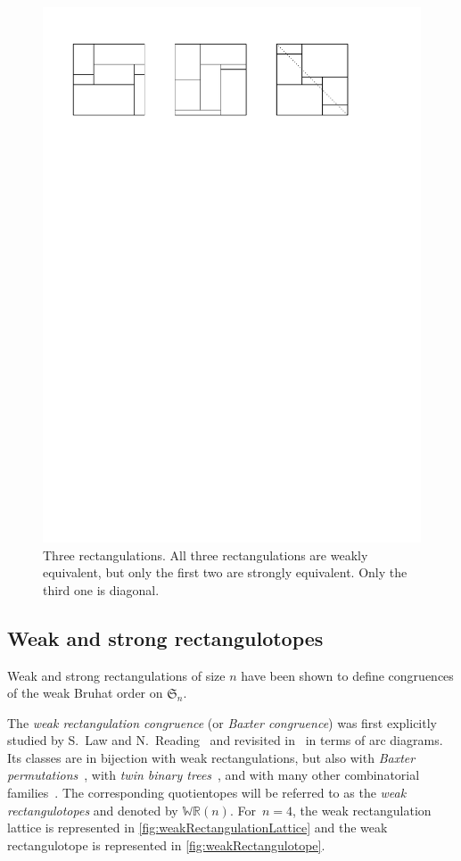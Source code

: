 \documentclass{amsart}
\theoremstyle{definition}
\newcommand{\f}[1]{\mathfrak{#1}} %
\newcommand{\darkblue}{\color{darkblue}} %
\newcommand{\defn}[1]{\textsl{\darkblue #1}} %
\newcommand{\polytope}[1]{\mathds{#1}} %
\newcommand{\WRP}{\polytope{WR}} %
\begin{document}
\begin{figure}
  \includegraphics[width=.7\textwidth]{rectangulations.pdf}
	\caption{Three rectangulations. All three rectangulations are weakly equivalent, but only the first two are strongly equivalent. Only the third one is diagonal.}
	\label{fig:rectequiv}
\end{figure}

\subsection{Weak and strong rectangulotopes}

Weak and strong rectangulations of size $n$ have been shown to define congruences of the weak Bruhat order on $\f{S}_n$.

The \defn{weak rectangulation congruence} (or \defn{Baxter congruence}) was first explicitly studied by S.~Law and N.~Reading~\cite{MR2871762} and revisited in~\cite[Thm.~1.1 \& Exm.~4.10]{Reading-arcDiagrams} in terms of arc diagrams.
Its classes are in bijection with weak rectangulations, but also with \defn{Baxter permutations}~\cite{MR0491652,MR0555815}, with \defn{twin binary trees}~\cite{MR1417289,MR2914637}, and with many other combinatorial families~\cite{MR2763051}. 
The corresponding quotientopes will be referred to as the \defn{weak rectangulotopes} and denoted by $\WRP(n)$.
For~$n = 4$, the weak rectangulation lattice is represented in \cref{fig:weakRectangulationLattice} and the weak rectangulotope is represented in \cref{fig:weakRectangulotope}.
\end{document}
